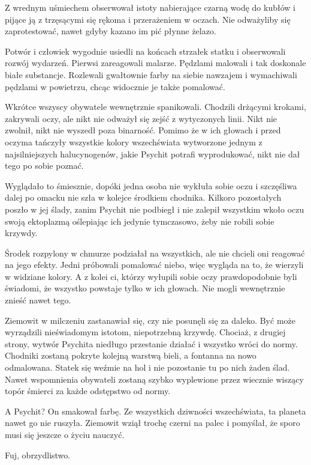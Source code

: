 Z wrednym uśmiechem obserwował istoty nabierające czarną wodę do kubłów i pijące ją z trzęsącymi się rękoma i przerażeniem w oczach.
Nie odważyliby się zaprotestować, nawet gdyby kazano im pić płynne żelazo.

\divider{}
Potwór i człowiek wygodnie usiedli na końcach strzałek statku i obserwowali rozwój wydarzeń.
Pierwsi zareagowali malarze. Pędzlami malowali i tak doskonale białe substancje. 
Rozlewali gwałtownie farby na siebie nawzajem i wymachiwali pędzlami w powietrzu, chcąc widocznie je także pomalować.

Wkrótce wszyscy obywatele wewnętrznie spanikowali. Chodzili drżącymi krokami, zakrywali oczy, ale nikt nie odważył się zejść z wytyczonych linii.
Nikt nie zwolnił, nikt nie wyszedł poza binarność.
Pomimo że w ich głowach i przed oczyma tańczyły wszystkie kolory wszechświata wytworzone jednym z najsilniejszych halucynogenów, 
jakie Psychit potrafi wyprodukować, nikt nie dał tego po sobie poznać.

Wyglądało to śmiesznie, dopóki jedna osoba nie wykłuła sobie oczu i szczęśliwa dalej po omacku nie szła w kolejce środkiem chodnika.
Kilkoro pozostałych poszło w jej ślady, zanim Psychit nie podbiegł i nie zalepił wszystkim wkoło oczu swoją ektoplazmą oślepiając ich jedynie tymczasowo, 
żeby nie robili sobie krzywdy.

Środek rozpylony w chmurze podziałał na wszystkich, ale nie chcieli oni reagować na jego efekty.
Jedni próbowali pomalować niebo, więc wygląda na to, że wierzyli w widziane kolory.
A z kolei ci, którzy wyłupili sobie oczy prawdopodobnie byli świadomi, że wszystko powstaje tylko w ich głowach.
Nie mogli wewnętrznie znieść nawet tego.

Ziemowit w milczeniu zastanawiał się, czy nie posunęli się za daleko.
Być może wyrządzili nieświadomym istotom, niepotrzebną krzywdę.
Chociaż, z drugiej strony, wytwór Psychita niedługo przestanie działać i wszystko wróci do normy.
Chodniki zostaną pokryte kolejną warstwą bieli, a fontanna na nowo odmalowana.
Statek się weźmie na hol i nie pozostanie tu po nich żaden ślad.
Nawet wspomnienia obywateli zostaną szybko wyplewione przez wiecznie wiszący topór śmierci za każde odstępstwo od normy.

A Psychit? On smakował farbę. 
Ze wszystkich dziwności wszechświata, ta planeta nawet go nie ruszyła.
Ziemowit wziął trochę czerni na palec i pomyślał, że sporo musi się jeszcze o życiu nauczyć.

Fuj, obrzydlistwo.







